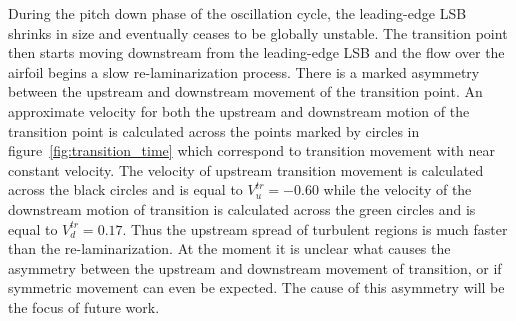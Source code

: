 During the pitch down phase of the oscillation cycle, the leading-edge LSB shrinks in size and eventually ceases to be globally unstable. The transition point then starts moving downstream from the leading-edge LSB and the flow over the airfoil begins a slow re-laminarization process. There is a marked asymmetry between the upstream and downstream movement of the transition point. An approximate velocity for both the upstream and downstream motion of the transition point is calculated across the points marked by circles in figure~\ref{fig:transition_time} which correspond to transition movement with near constant velocity. The velocity of upstream transition movement is calculated across the black circles and is equal to $V^{tr}_{u}=-0.60$ while the velocity of the downstream motion of transition is calculated across the green circles and is equal to $V^{tr}_{d}=0.17$. Thus the upstream spread of turbulent regions is much faster than the re-laminarization. At the moment it is unclear what causes the asymmetry between the upstream and downstream movement of transition, or if symmetric movement can even be expected. The cause of this asymmetry will be the focus of future work.

